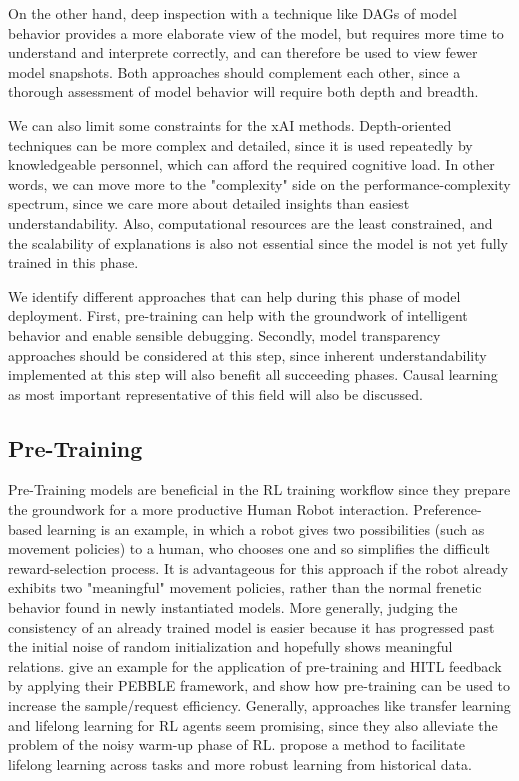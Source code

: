 \documentclass[twoside,11pt]{article}
\begin{document}
On the other hand, deep inspection with a technique like DAGs of model behavior provides a more elaborate view of the model, but requires more time to understand and interprete correctly, and can therefore be used to view fewer model snapshots. Both approaches should complement each other, since a thorough assessment of model behavior will require both depth and breadth.

We can also limit some constraints for the xAI methods. Depth-oriented techniques can be more complex and detailed, since it is used repeatedly by knowledgeable personnel, which can afford the required cognitive load. In other words, we can move more to the "complexity" side on the performance-complexity spectrum, since we care more about detailed insights than easiest understandability.
Also, computational resources are the least constrained, and the scalability of explanations is also not essential since the model is not yet fully trained in this phase.

We identify different approaches that can help during this phase of model deployment.
First, pre-training can help with the groundwork of intelligent behavior and enable sensible debugging. Secondly, model transparency approaches should be considered at this step, since inherent understandability implemented at this step will also benefit all succeeding phases. Causal learning as most important representative of this field will also be discussed.

\subsection{Pre-Training}

Pre-Training models are beneficial in the RL training workflow since they prepare the groundwork for a more productive Human Robot interaction.
Preference-based learning is an example, in which a robot gives two possibilities (such as movement policies) to a human, who chooses one and so simplifies the difficult reward-selection process. It is advantageous for this approach if the robot already exhibits two "meaningful" movement policies, rather than the normal frenetic behavior found in newly instantiated models.
More generally, judging the consistency of an already trained model is easier because it has progressed past the initial noise of random initialization and hopefully shows meaningful relations. \cite{LeeSmithAbbeel:2021:FeedbackPreferenceHITLLearningPEBBLE} give an example for the application of pre-training and HITL feedback by applying their PEBBLE framework, and show how pre-training can be used to increase the sample/request efficiency.
Generally, approaches like transfer learning and lifelong learning for RL agents seem promising, since they also alleviate the problem of the noisy warm-up phase of RL. \citet{AzarLazaricBrunskill:2013:LifelongLearning} propose a method to facilitate lifelong learning across tasks and more robust learning from historical data.
\end{document}
